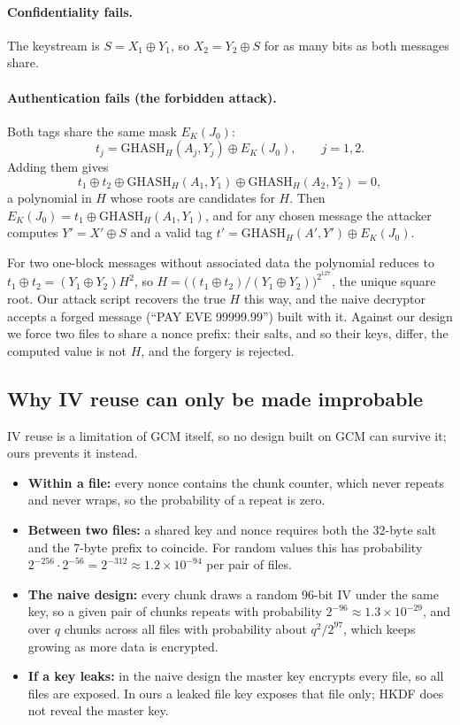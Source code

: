 \documentclass[11pt,a4paper]{article}
\begin{document}
\paragraph{Confidentiality fails.} The keystream is $S = X_1 \oplus Y_1$, so $X_2 = Y_2 \oplus S$ for as many bits as both messages share.

\paragraph{Authentication fails (the forbidden attack).} Both tags share the same mask $E_K(J_0)$:
\[ t_j = \mathrm{GHASH}_H(A_j, Y_j) \oplus E_K(J_0), \qquad j = 1, 2. \]
Adding them gives
\[
t_1 \oplus t_2 \oplus \mathrm{GHASH}_H(A_1, Y_1) \oplus \mathrm{GHASH}_H(A_2, Y_2) = 0,
\]
a polynomial in $H$ whose roots are candidates for $H$. Then $E_K(J_0) = t_1 \oplus \mathrm{GHASH}_H(A_1, Y_1)$, and for any chosen message the attacker computes $Y' = X' \oplus S$ and a valid tag $t' = \mathrm{GHASH}_H(A', Y') \oplus E_K(J_0)$.

For two one-block messages without associated data the polynomial reduces to $t_1 \oplus t_2 = (Y_1 \oplus Y_2) H^2$, so $H = \big((t_1\oplus t_2)/(Y_1\oplus Y_2)\big)^{2^{127}}$, the unique square root. Our attack script recovers the true $H$ this way, and the naive decryptor accepts a forged message (``PAY EVE 99999.99'') built with it. Against our design we force two files to share a nonce prefix: their salts, and so their keys, differ, the computed value is not $H$, and the forgery is rejected.

\subsection{Why IV reuse can only be made improbable}
IV reuse is a limitation of GCM itself, so no design built on GCM can survive it; ours prevents it instead.
\begin{itemize}
\item \textbf{Within a file:} every nonce contains the chunk counter, which never repeats and never wraps, so the probability of a repeat is zero.
\item \textbf{Between two files:} a shared key and nonce requires both the 32-byte salt and the 7-byte prefix to coincide. For random values this has probability $2^{-256}\cdot 2^{-56} = 2^{-312} \approx 1.2\times 10^{-94}$ per pair of files.
\item \textbf{The naive design:} every chunk draws a random 96-bit IV under the same key, so a given pair of chunks repeats with probability $2^{-96} \approx 1.3\times 10^{-29}$, and over $q$ chunks across all files with probability about $q^2/2^{97}$, which keeps growing as more data is encrypted.
\item \textbf{If a key leaks:} in the naive design the master key encrypts every file, so all files are exposed. In ours a leaked file key exposes that file only; HKDF does not reveal the master key.
\end{itemize}
\end{document}
